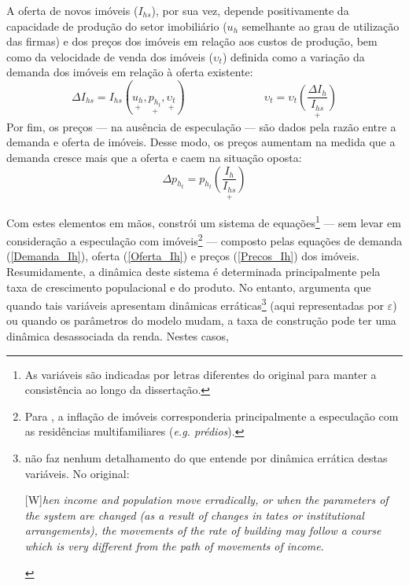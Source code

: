 A oferta de novos imóveis ($I_{hs}$), por sua vez, 
depende positivamente da capacidade de produção do setor imobiliário ($u_h$ semelhante ao grau de utilização das firmas) e dos preços dos imóveis em relação aos custos de produção, bem como da velocidade de venda dos imóveis ($\upsilon_t$) definida como a variação da demanda dos imóveis em relação à oferta existente:
\begin{equation}
\label{Oferta_Ih}
\Delta I_{hs} =  I_{hs}(\underset{+}{u_h}, \underset{+}{p_{h_t}}, \underset{+}{\upsilon_t}) \hspace{3cm} \upsilon_t = \upsilon_t\underset{+}{\left(\frac{\Delta I_h}{I_{hs}}\right)}
\end{equation}
Por fim, os preços --- na ausência de especulação --- são dados pela razão entre a demanda e oferta de imóveis.
Desse modo, os preços aumentam na medida que a demanda cresce mais que a oferta e caem na situação oposta:
\begin{equation}
\label{Precos_Ih}
\Delta p_{h_t} = p_{h_t}\underset{+}{\left(\frac{I_{h}}{I_{hs}}\right)}
\end{equation}

Com estes elementos em mãos, \textcite{duesenberry_investment_1958} constrói um sistema de equações\footnote{As variáveis são indicadas por letras diferentes do original para manter a consistência ao longo da dissertação.}  --- sem levar em consideração a especulação com imóveis\footnote{Para \textcite{duesenberry_investment_1958}, a inflação de imóveis corresponderia principalmente a especulação com as residências multifamiliares (\textit{e.g. prédios}).} ---  composto pelas equações de demanda (\ref{Demanda_Ih}), oferta (\ref{Oferta_Ih}) e preços (\ref{Precos_Ih}) dos imóveis.
Resumidamente, a dinâmica deste sistema é determinada principalmente pela taxa de crescimento populacional e do produto. No entanto, \textcite{duesenberry_investment_1958} argumenta que quando tais variáveis apresentam dinâmicas erráticas\footnote{\textcite[p.~158]{duesenberry_investment_1958} não faz nenhum detalhamento do que entende por dinâmica errática destas variáveis. No original:

\begin{citacao}

[W]\textit{hen income and population move erradically, or when the parameters of the system are changed (as a result of changes in tates or institutional arrangements), the movements of the rate of building may follow a course which is very different from the path of movements of income}.
\end{citacao}

} (aqui representadas por $\varepsilon$) ou quando os parâmetros do modelo mudam, a taxa de construção pode ter uma dinâmica desassociada da renda. Nestes casos,

